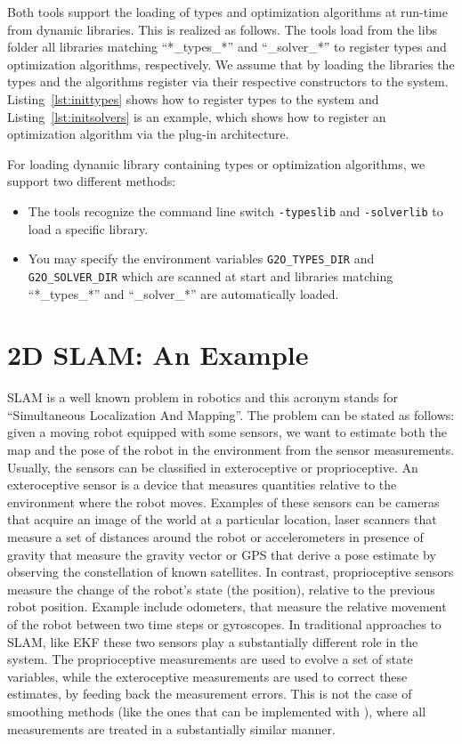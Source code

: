 \documentclass[a4paper]{article}
\begin{document}
Both tools support the loading of types and optimization algorithms at
run-time from dynamic libraries. This is realized as follows. The tools
load from the libs folder all libraries matching ``*\_types\_*'' and
``\_solver\_*'' to register types and optimization algorithms,
respectively. We assume that by loading the libraries the types and the
algorithms register via their respective constructors to the system.
Listing~\ref{lst:inittypes} shows how to register types to the system
and Listing~\ref{lst:initsolvers} is an example, which shows how to
register an optimization algorithm via the plug-in architecture.

For loading dynamic library containing types or optimization algorithms, we support two
different methods:
\begin{itemize}
  \item The tools recognize the command line switch \verb+-typeslib+
    and \verb+-solverlib+ to load a specific library.
  \item You may specify the environment variables \verb+G2O_TYPES_DIR+
    and \verb+G2O_SOLVER_DIR+ which are scanned at start and libraries
    matching ``*\_types\_*'' and ``\_solver\_*'' are automatically
    loaded.
\end{itemize}

\section{2D SLAM: An Example}
SLAM is a well known problem in robotics and this acronym stands for
``Simultaneous Localization And Mapping''. The problem can be stated
as follows: given a moving robot equipped with some sensors, we want
to estimate both the map and the pose of the robot in the environment
from the sensor measurements. Usually, the sensors can be classified
in exteroceptive or proprioceptive.  An exteroceptive sensor is a
device that measures quantities relative to the environment where the
robot moves.  Examples of these sensors can be cameras that acquire an
image of the world at a particular location, laser scanners that
measure a set of distances around the robot or accelerometers in
presence of gravity that measure the gravity vector or GPS that derive
a pose estimate by observing the constellation of known satellites.
In contrast, proprioceptive sensors measure the change of the robot's
state (the position), relative to the previous robot position. Example
include odometers, that measure the relative movement of the robot
between two time steps or gyroscopes. In traditional approaches to
SLAM, like EKF these two sensors play a substantially different role
in the system.  The proprioceptive measurements are used to evolve a
set of state variables, while the exteroceptive measurements are used
to correct these estimates, by feeding back the measurement errors.
This is not the case of smoothing methods (like the ones that can be
implemented with \gopt{}), where all measurements are treated in a
substantially similar manner.
\end{document}
